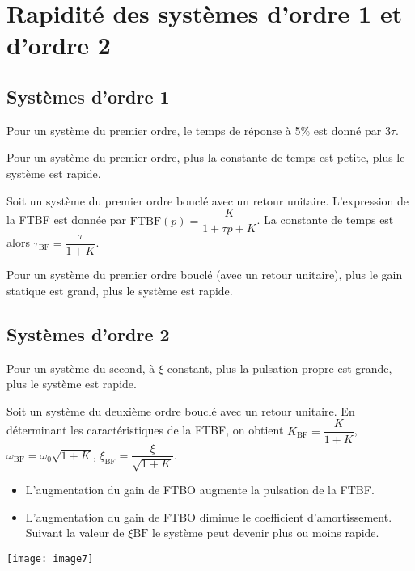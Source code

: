 \section{Rapidité des systèmes d'ordre 1 et d'ordre 2}
\subsection{Systèmes d'ordre 1}
Pour un système du premier ordre, le temps de réponse à 5\% est donné par $3\tau$.
\begin{resultat}
Pour un système du premier ordre, plus la constante de temps est petite, plus le système est rapide.
\end{resultat}

Soit un système du premier ordre bouclé avec un retour unitaire. L'expression de la FTBF est donnée par $\text{FTBF}(p)=\dfrac{K}{1+\tau p + K}$. La constante de temps est alors $\tau_{\text{BF}}=\dfrac{\tau}{1+K}$. 

\begin{resultat}
Pour un système du premier ordre bouclé (avec un retour unitaire), plus le gain statique est grand, plus le système est rapide. 
\end{resultat}

\subsection{Systèmes d'ordre 2}

\noindent\begin{minipage}[c]{.5\linewidth}
\begin{resultat}
Pour un système du second, à $\xi$ constant, plus la pulsation propre est grande, plus le système est rapide. 
\end{resultat} 



Soit un système du deuxième ordre bouclé avec un retour unitaire. En déterminant les caractéristiques de la FTBF, on obtient $K_{\text{BF}}=\dfrac{K}{1+K}$, $\omega_{\text{BF}}=\omega_0\sqrt{1+K}$, $\xi_{\text{BF}}=\dfrac{\xi}{\sqrt{1+K}}$.


\begin{resultat}
\begin{itemize}
\item L'augmentation du gain de FTBO augmente la pulsation de la FTBF. 
\item L'augmentation du gain de FTBO diminue le coefficient d'amortissement. Suivant la valeur de $\xi{\text{BF}}$ le système peut devenir plus ou moins rapide.  
\end{itemize}
\end{resultat}

\end{minipage}\hfill
\begin{minipage}[c]{.47\linewidth}
\begin{center}
\texttt{[image: image7]}
\end{center}
\end{minipage}

